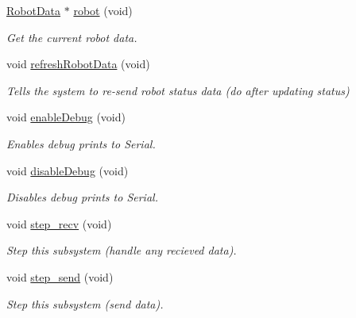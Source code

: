 \begin{DoxyCompactItemize}
\hyperlink{class_robot_data}{Robot\+Data} $\ast$ \hyperlink{class_messenger_aa07992df20b2aee6d2c4defd8d6b110c}{robot} (void)
\begin{DoxyCompactList}\small\item\em Get the current robot data. \end{DoxyCompactList}\item 
void \hyperlink{class_messenger_ad5df7d4bf31502b3aad9f04b5e830e2c}{refresh\+Robot\+Data} (void)
\begin{DoxyCompactList}\small\item\em Tells the system to re-\/send robot status data (do after updating status) \end{DoxyCompactList}\item 
void \hyperlink{class_messenger_a6cb2c50700cc4b8824c7f6b07a3216ff}{enable\+Debug} (void)
\begin{DoxyCompactList}\small\item\em Enables debug prints to Serial. \end{DoxyCompactList}\item 
void \hyperlink{class_messenger_a31339b4d655cae6e8e7d567554210463}{disable\+Debug} (void)
\begin{DoxyCompactList}\small\item\em Disables debug prints to Serial. \end{DoxyCompactList}\item 
void \hyperlink{class_messenger_abdf16b0ba616983f4c4b1895ed937eb2}{step\+\_\+recv} (void)
\begin{DoxyCompactList}\small\item\em Step this subsystem (handle any recieved data). \end{DoxyCompactList}\item 
void \hyperlink{class_messenger_a7e37226a7ee3e139fe22e05067e0013b}{step\+\_\+send} (void)
\begin{DoxyCompactList}\small\item\em Step this subsystem (send data). \end{DoxyCompactList}\end{DoxyCompactItemize}
